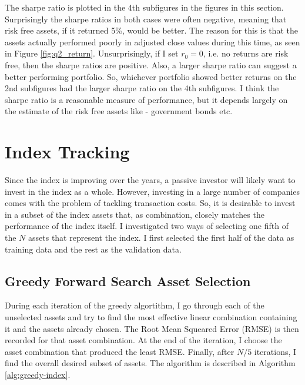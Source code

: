 \documentclass[11pt]{article}
\begin{document}
The sharpe ratio is plotted in the 4th subfigures in the figures in this section. Surprisingly the sharpe
ratios in both cases were often negative, meaning that risk free assets, if it returned 5\%, would be better.
The reason for this is that the assets actually performed poorly in adjusted close values during this
time, as seen in Figure \ref{fig:q2_return}. Unsurprisingly, if I set $r_0 = 0$, i.e. no returns are risk free,
then the sharpe ratios are positive. Also, a larger sharpe ratio can suggest a better performing portfolio. So, whichever portfolio showed
better returns on the 2nd subfigures had the larger sharpe ratio on the 4th subfigures. I think the sharpe ratio
is a reasonable measure of performance, but it depends largely on the estimate of the risk free assets like -
government bonds etc.

\section{Index Tracking}

Since the index is improving over the years, a passive investor will likely want to invest in the index as a whole.
However, investing in a large number of companies comes with the problem of tackling transaction costs. So, it is
desirable to invest in a subset of the index assets that, as combination, closely matches the performance of the index
itself. I investigated two ways of selecting one fifth of the $N$ assets that represent the index. I first selected
the first half of the data as training data and the rest as the validation data.

\subsection{Greedy Forward Search Asset Selection}

During each iteration of the greedy algortithm, I go through each of the unselected assets and try to find the most
effective linear combination containing it and the assets already chosen. The Root Mean Squeared Error (RMSE) is then
recorded for that asset combination. At the end of the iteration, I choose the asset combination that produced the 
least RMSE. Finally, after $N/5$ iterations, I find the overall desired subset of assets. The algorithm is described in
Algorithm \ref{alg:greedy-index}.
\end{document}
